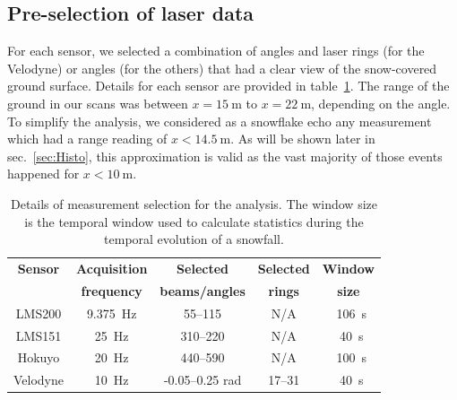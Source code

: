 \subsection{Pre-selection of laser data}
For each sensor, we selected a combination of angles and laser rings (for the Velodyne) or angles (for the others) that had a clear view of the snow-covered ground surface. Details for each sensor are provided in table~\ref{tab:selectionScans}. The range of the ground in our scans was between $x=\SI{15}{\meter}$ to $x=\SI{22}{\meter}$, depending on the angle. To simplify the analysis, we considered as a snowflake echo any measurement which had a range reading of $x<\SI{14.5}{\meter}$. As will be shown later in sec.~\ref{sec:Histo}, this approximation is valid as the vast majority of those events happened for $x<\SI{10}{\meter}$. %

\begin{table}[htbp]
    \centering
    \begin{tabular}{|c|c|c|c|c|}
        \hline
        \textbf{Sensor}            & \textbf{Acquisition}  & \textbf{Selected}  & \textbf{Selected}  & \textbf{Window} \\
        \textbf{ }                     & \textbf{frequency}  & \textbf{beams/angles}  & \textbf{rings}  & \textbf{size} \\\hline
       LMS200               & \SI{9.375}{\Hz}                      & 55--115                                    & N/A                         & ~\SI{106}{\second}       \\\hline
        LMS151               & \SI{25}{\Hz}                           & 310--220                                  & N/A                         & ~\SI{40}{\second}        \\\hline
        Hokuyo               & \SI{20}{\Hz}                          & 440--590                                  & N/A                         & ~\SI{100}{\second}     \\\hline
        Velodyne             & \SI{10}{\Hz}                          & -0.05--0.25 rad                     & 17--31                   & ~\SI{40}{\second}      \\\hline
    \end{tabular}
    \caption{Details of measurement selection for the analysis. The window size is the temporal window used to calculate statistics during the temporal evolution of a snowfall.}
    \label{tab:selectionScans}
\end{table}

